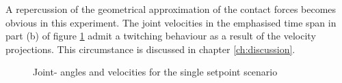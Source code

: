 A repercussion of the geometrical approximation of the contact forces becomes obvious in this experiment. The joint velocities in the emphasised time span in part (b) of figure \ref{fig:case2-1-plot} admit a twitching behaviour as a result of the velocity projections. This circumstance is discussed in chapter \ref{ch:discussion}.


\begin{figure}[hbt!]
    \centering
    


    \caption{Joint- angles and velocities for the single setpoint scenario}
    \label{fig:case2-1-plot}
\end{figure}

